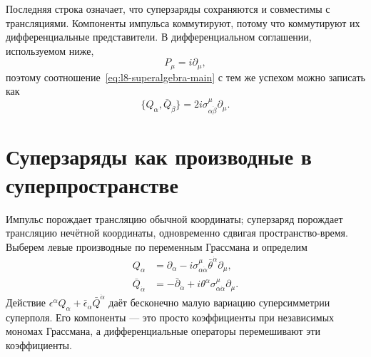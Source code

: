 Последняя строка означает, что суперзаряды сохраняются и совместимы с трансляциями. Компоненты импульса коммутируют, потому что коммутируют их дифференциальные представители. В дифференциальном соглашении, используемом ниже, \begin{equation}
P_\mu=i\partial_\mu,
\end{equation} поэтому соотношение~\eqref{eq:l8-superalgebra-main} с тем же успехом можно записать как \begin{equation}
\{Q_\alpha,\bar Q_{\dot\beta}\}
=2i\sigma^\mu_{\alpha\dot\beta}\partial_\mu.
\end{equation}

\section{Суперзаряды как производные в суперпространстве}

Импульс порождает трансляцию обычной координаты; суперзаряд порождает трансляцию нечётной координаты, одновременно сдвигая пространство-время. Выберем левые производные по переменным Грассмана и определим \begin{align}
Q_\alpha
&=\partial_\alpha
-i\sigma^\mu_{\alpha\dot\alpha}
\bar\theta^{\dot\alpha}\partial_\mu,
\label{eq:l8-Q}\\
\bar Q_{\dot\alpha}
&=-\bar\partial_{\dot\alpha}
+i\theta^\alpha\sigma^\mu_{\alpha\dot\alpha}\partial_\mu.
\label{eq:l8-Qbar}
\end{align} Действие \(\epsilon^\alpha Q_\alpha+
\bar\epsilon_{\dot\alpha}\bar Q^{\dot\alpha}\) даёт бесконечно малую вариацию суперсимметрии суперполя. Его компоненты — это просто коэффициенты при независимых мономах Грассмана, а дифференциальные операторы перемешивают эти коэффициенты.

\begin{classroomqa}\end{classroomqa}

\begin{classroomqa}\end{classroomqa}

